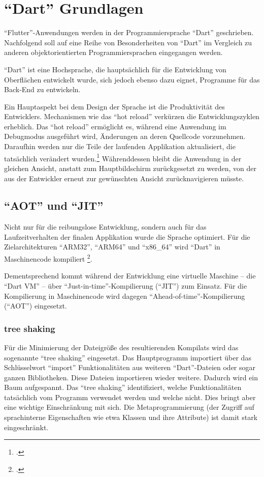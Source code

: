 \section{\enquote{Dart} Grundlagen}
\label{sec:Dart-Grundlagen}

\enquote{Flutter}-Anwendungen werden in der Programmiersprache \enquote{Dart} geschrieben.
Nachfolgend soll auf eine Reihe von Besonderheiten von \enquote{Dart} im Vergleich zu anderen objektorientierten Programmiersprachen eingegangen werden.

\enquote{Dart} ist eine Hochsprache, die hauptsächlich für die Entwicklung von Oberflächen entwickelt wurde, sich jedoch ebenso dazu eignet, Programme für das Back-End zu entwickeln.

Ein Hauptaspekt bei dem Design der Sprache ist die Produktivität des Entwicklers.
Mechanismen wie das \enquote{hot reload} verkürzen die Entwicklungszyklen erheblich.
Das \enquote{hot reload} ermöglicht es, während eine Anwendung im Debugmodus ausgeführt wird, Änderungen an deren Quellcode vorzunehmen.
Daraufhin werden nur die Teile der laufenden Applikation aktualisiert, die tatsächlich verändert wurden.\footcite[Vgl.][]{HotReload}
 Währenddessen bleibt die Anwendung in der gleichen Ansicht, anstatt zum Hauptbildschirm zurückgesetzt zu werden, von der aus der Entwickler erneut zur gewünschten Ansicht zurücknavigieren müsste.

\subsection{\enquote{AOT} und \enquote{JIT}}
Nicht nur für die reibungslose Entwicklung, sondern auch für das Laufzeitverhalten der finalen Applikation wurde die Sprache optimiert.
Für die Zielarchitekturen \enquote{ARM32}, \enquote{ARM64} und \enquote{x86_64} wird \enquote{Dart} in Maschinencode kompiliert \footcite[Vgl.][]{DartThePlatforms}.

Dementsprechend kommt während der Entwicklung eine virtuelle Maschine -- die \enquote{Dart VM} -- über \enquote{Just-in-time}-Kompilierung (\enquote{JIT}) zum Einsatz.
Für die Kompilierung in Maschinencode wird dagegen \enquote{Ahead-of-time}-Kompilierung (\enquote{AOT}) eingesetzt.

\subsubsection{tree shaking}
Für die Minimierung der Dateigröße des resultierenden Kompilats wird das sogenannte \enquote{tree shaking} eingesetzt.
Das Hauptprogramm importiert über das Schlüsselwort \enquote{import} Funktionalitäten aus  weiteren \enquote{Dart}-Dateien oder sogar ganzen Bibliotheken.
Diese Dateien importieren wieder weitere.
Dadurch wird ein Baum aufgespannt.
Das \enquote{tree shaking} identifiziert, welche Funktionalitäten tatsächlich vom Programm verwendet werden und welche nicht.
Dies bringt aber eine wichtige Einschränkung mit sich.
Die Metaprogrammierung (der Zugriff auf sprachinterne Eigenschaften wie etwa Klassen und ihre Attribute) ist damit stark eingeschränkt.

